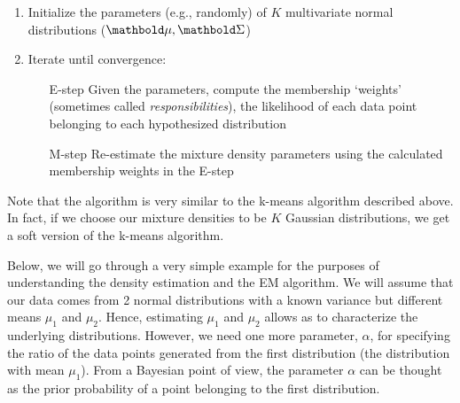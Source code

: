 \begin{enumerate}
  \item Initialize the parameters (e.g., randomly)
    of $K$ multivariate normal distributions ($\vect{\mu}, \vect{\Sigma}$)
  \item Iterate until convergence:
    \begin{itemize}
      \item[E-step] Given the parameters,
        compute the membership `weights'
        (sometimes called \emph{responsibilities}),
        the likelihood of each data point belonging to
        each hypothesized distribution
      \item[M-step] Re-estimate the mixture density parameters
        using the calculated membership weights in the E-step
    \end{itemize}
\end{enumerate}

Note that the algorithm is very similar to
the k-means algorithm described above.
In fact, if we choose our mixture densities to be $K$ Gaussian distributions,
we get a soft version of the k-means algorithm.

Below, we will go through a very simple example
for the purposes of understanding the density estimation and the EM algorithm.
We will assume that our data comes from \num{2} normal distributions
with a known variance but different means $\mu_{1}$ and $\mu_{2}$.
Hence, estimating $\mu_{1}$ and $\mu_{2}$ allows as to characterize
the underlying distributions.
However, we need one more parameter, $\alpha$, for specifying
the ratio of the data points generated from the first distribution
(the distribution with mean $\mu_{1}$).%
From a Bayesian point of view,
the parameter $\alpha$ can be thought as the prior probability
of a point belonging to the first distribution.

